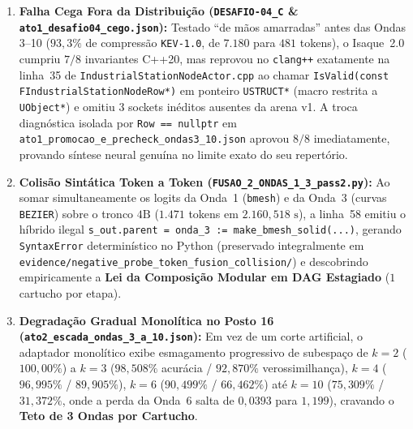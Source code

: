 \documentclass[10pt,a4paper]{article}
\begin{document}
\begin{enumerate}
  \item \textbf{Falha Cega Fora da Distribui\c{c}\~ao (\texttt{DESAFIO-04\_\allowbreak{}C} \& \texttt{ato1\_\allowbreak{}desafio04\_\allowbreak{}cego.json}):} Testado ``de m\~aos amarradas'' antes das Ondas 3--10 ($93,3\%$ de compress\~ao \texttt{KEV-1.0}, de $7.180$ para $481$ tokens), o Isaque~2.0 cumpriu $7/8$ invariantes C++20, mas reprovou no \texttt{clang++} exatamente na linha~35 de \texttt{IndustrialStationNodeActor.cpp} ao chamar \texttt{IsValid(const FIndustrialStationNodeRow*)} em ponteiro \texttt{USTRUCT*} (macro restrita a \texttt{UObject*}) e omitiu 3 sockets in\'editos ausentes da arena v1. A troca diagn\'ostica isolada por \texttt{Row == nullptr} em \texttt{ato1\_\allowbreak{}promocao\_\allowbreak{}e\_\allowbreak{}precheck\_\allowbreak{}ondas3\_\allowbreak{}10.json} aprovou $8/8$ imediatamente, provando s\'intese neural genu\'ina no limite exato do seu repert\'orio.
  \item \textbf{Colis\~ao Sint\'atica Token a Token (\texttt{FUSAO\_\allowbreak{}2\_\allowbreak{}ONDAS\_\allowbreak{}1\_\allowbreak{}3\_\allowbreak{}pass2.py}):} Ao somar simultaneamente os logits da Onda~1 (\texttt{bmesh}) e da Onda~3 (curvas \texttt{BEZIER}) sobre o tronco $4\text{B}$ ($1.471$ tokens em $2.160,518\text{ s}$), a linha~58 emitiu o h\'ibrido ilegal \texttt{s\_\allowbreak{}out.parent = onda\_\allowbreak{}3 := make\_\allowbreak{}bmesh\_\allowbreak{}solid(...)}, gerando \texttt{SyntaxError} determin\'istico no Python (preservado integralmente em \texttt{evidence/negative\_\allowbreak{}probe\_\allowbreak{}token\_\allowbreak{}fusion\_\allowbreak{}collision/}) e descobrindo empiricamente a \textbf{Lei da Composi\c{c}\~ao Modular em DAG Estagiado} ($1$ cartucho por etapa).
  \item \textbf{Degrada\c{c}\~ao Gradual Monol\'itica no Posto 16 (\texttt{ato2\_\allowbreak{}escada\_\allowbreak{}ondas\_\allowbreak{}3\_\allowbreak{}a\_\allowbreak{}10.json}):} Em vez de um corte artificial, o adaptador monol\'itico exibe esmagamento progressivo de subespa\c{c}o de $k=2$ ($100,00\%$) a $k=3$ ($98,508\%$ acur\'acia / $92,870\%$ verossimilhan\c{c}a), $k=4$ ($96,995\%$ / $89,905\%$), $k=6$ ($90,499\%$ / $66,462\%$) at\'e $k=10$ ($75,309\%$ / $31,372\%$, onde a perda da Onda~6 salta de $0,0393$ para $1,199$), cravando o \textbf{Teto de 3 Ondas por Cartucho}.
\end{enumerate}
\end{document}
